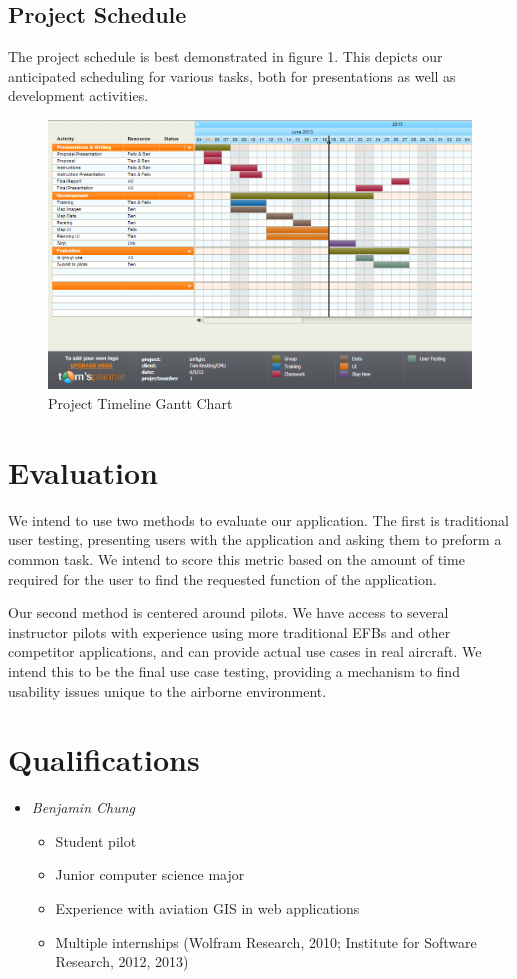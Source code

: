 \documentclass[10pt,a4paper]{article}
\begin{document}
\subsection{Project Schedule}
The project schedule is best demonstrated in figure 1. This depicts our anticipated scheduling for various tasks, both for presentations as well as development activities.
\begin{figure}
\includegraphics[scale=.4]{gantt}
\caption{Project Timeline Gantt Chart}
\end{figure}
\section{Evaluation}
We intend to use two methods to evaluate our application. The first is traditional user testing, presenting users with the application and asking them to preform a common task. We intend to score this metric based on the amount of time required for the user to find the requested function of the application.

Our second method is centered around pilots. We have access to several instructor pilots with experience using more traditional EFBs and other competitor applications, and can provide actual use cases in real aircraft. We intend this to be the final use case testing, providing a mechanism to find usability issues unique to the airborne environment.

\section{Qualifications}
\begin{itemize}
\item \emph{Benjamin Chung} 
\begin{itemize}
\item Student pilot
\item Junior computer science major
\item Experience with aviation GIS in web applications
\item Multiple internships (Wolfram Research, 2010; Institute for Software Research, 2012, 2013)
\end{itemize}
\end{itemize}
\end{document}
